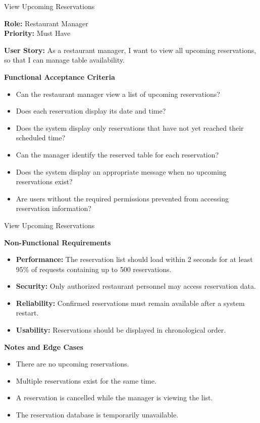 
\begin{frame}{View Upcoming Reservations}

\noindent\textbf{Role:} Restaurant Manager\\
\textbf{Priority:} Must Have

\textbf{User Story:} As a restaurant manager, I want to view all upcoming reservations, so that I can manage table availability.

\textbf{Functional Acceptance Criteria}
\begin{itemize}
  \item Can the restaurant manager view a list of upcoming reservations?
  \item Does each reservation display its date and time?
  \item Does the system display only reservations that have not yet reached their scheduled time?
  \item Can the manager identify the reserved table for each reservation?
  \item Does the system display an appropriate message when no upcoming reservations exist?
  \item Are users without the required permissions prevented from accessing reservation information?
\end{itemize}

\end{frame}

\begin{frame}{View Upcoming Reservations}

\textbf{Non-Functional Requirements}
\begin{itemize}
  \item \textbf{Performance:} The reservation list should load within 2 seconds for at least 95\% of requests containing up to 500 reservations.
  \item \textbf{Security:} Only authorized restaurant personnel may access reservation data.
  \item \textbf{Reliability:} Confirmed reservations must remain available after a system restart.
  \item \textbf{Usability:} Reservations should be displayed in chronological order.
\end{itemize}

\textbf{Notes and Edge Cases}
\begin{itemize}
  \item There are no upcoming reservations.
  \item Multiple reservations exist for the same time.
  \item A reservation is cancelled while the manager is viewing the list.
  \item The reservation database is temporarily unavailable.
\end{itemize}

\end{frame}
